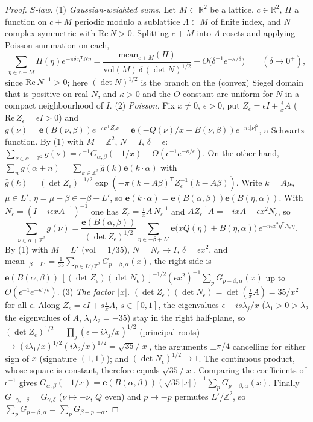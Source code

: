 \documentclass[11pt]{article}
\theoremstyle{definition}
\newcommand{\Z}{\mathbb{Z}}
\newcommand{\R}{\mathbb{R}}
\newcommand{\e}{\mathbf{e}}
\begin{document}
\begin{proof}
\emph{$S$-law.} (1) \emph{Gaussian-weighted sums.} Let $M\subset\R^2$ be a lattice, $c\in\R^2$, $\Pi$ a function on $c+M$ periodic modulo a
sublattice $\Lambda\subset M$ of finite index, and $N$ complex symmetric with $\mathrm{Re}\,N>0$. Splitting $c+M$ into $\Lambda$-cosets and applying
Poisson summation on each,
\[
\sum_{\eta\in c+M}\Pi(\eta)e^{-\pi\delta\,\eta^{\mathsf T}N\eta}=\frac{\mathrm{mean}_{c+M}(\Pi)}{\mathrm{vol}(M)\,\delta\,(\det N)^{1/2}}+O\bigl(\delta^{-1}e^{-\kappa/\delta}\bigr)
\qquad(\delta\to0^+),
\]
since $\mathrm{Re}\,N^{-1}>0$; here $(\det N)^{1/2}$ is the branch on the (convex) Siegel domain that is positive on real $N$, and $\kappa>0$ and the
$O$-constant are uniform for $N$ in a compact neighbourhood of $I$.
(2) \emph{Poisson.} Fix $x\ne0$, $\epsilon>0$, put $Z_\epsilon=\epsilon I+\tfrac ixA$ ($\mathrm{Re}\,Z_\epsilon=\epsilon I>0$) and
$g(\nu)=\e(B(\nu,\beta))e^{-\pi\nu^{\mathsf T}Z_\epsilon\nu}=\e(-Q(\nu)/x+B(\nu,\beta))e^{-\pi\epsilon|\nu|^2}$, a Schwartz function. By (1) with
$M=\Z^2$, $N=I$, $\delta=\epsilon$: $\sum_{\nu\in\alpha+\Z^2}g(\nu)=\epsilon^{-1}G_{\alpha,\beta}(-1/x)+O(\epsilon^{-1}e^{-\kappa/\epsilon})$.
On the other hand, $\sum_ng(\alpha+n)=\sum_{k\in\Z^2}\widehat g(k)\e(k\cdot\alpha)$ with
$\widehat g(k)=(\det Z_\epsilon)^{-1/2}\exp(-\pi(k-A\beta)^{\mathsf T}Z_\epsilon^{-1}(k-A\beta))$. Write $k=A\mu$, $\mu\in L'$, $\eta=\mu-\beta\in-\beta+L'$,
so $\e(k\cdot\alpha)=\e(B(\alpha,\beta))\e(B(\eta,\alpha))$. With $N_\epsilon=(I-i\epsilon xA^{-1})^{-1}$ one has
$Z_\epsilon=\tfrac ixA\,N_\epsilon^{-1}$ and $AZ_\epsilon^{-1}A=-ixA+\epsilon x^2N_\epsilon$, so
\[
\sum_{\nu\in\alpha+\Z^2}g(\nu)=\frac{\e(B(\alpha,\beta))}{(\det Z_\epsilon)^{1/2}}\sum_{\eta\in-\beta+L'}\e\bigl(xQ(\eta)+B(\eta,\alpha)\bigr)\,
e^{-\pi\epsilon x^2\eta^{\mathsf T}N_\epsilon\eta}.
\]
By (1) with $M=L'$ ($\mathrm{vol}=1/35$), $N=N_\epsilon\to I$, $\delta=\epsilon x^2$, and
$\mathrm{mean}_{-\beta+L'}=\tfrac1{35}\sum_{p\in L'/\Z^2}G_{p-\beta,\alpha}(x)$, the right side is
$\e(B(\alpha,\beta))\,[(\det Z_\epsilon)(\det N_\epsilon)]^{-1/2}(\epsilon x^2)^{-1}\sum_pG_{p-\beta,\alpha}(x)$ up to $O(\epsilon^{-1}e^{-\kappa'/\epsilon})$.
(3) \emph{The factor $|x|$.} $(\det Z_\epsilon)(\det N_\epsilon)=\det(\tfrac ixA)=35/x^2$ for all $\epsilon$. Along $Z_{s}=\epsilon I+s\tfrac ixA$, $s\in[0,1]$,
the eigenvalues $\epsilon+is\lambda_j/x$ ($\lambda_1>0>\lambda_2$ the eigenvalues of $A$, $\lambda_1\lambda_2=-35$) stay in the right half-plane, so
$(\det Z_\epsilon)^{1/2}=\prod_j(\epsilon+i\lambda_j/x)^{1/2}$ (principal roots) $\to(i\lambda_1/x)^{1/2}(i\lambda_2/x)^{1/2}=\sqrt{35}/|x|$, the arguments
$\pm\pi/4$ cancelling for either sign of $x$ (signature $(1,1)$); and $(\det N_\epsilon)^{1/2}\to1$. The continuous product, whose square is
constant, therefore equals $\sqrt{35}/|x|$. Comparing the coefficients of $\epsilon^{-1}$ gives
$G_{\alpha,\beta}(-1/x)=\e(B(\alpha,\beta))(\sqrt{35}|x|)^{-1}\sum_pG_{p-\beta,\alpha}(x)$. Finally $G_{-\gamma,-\delta}=G_{\gamma,\delta}$ ($\nu\mapsto-\nu$,
$Q$ even) and $p\mapsto-p$ permutes $L'/\Z^2$, so $\sum_pG_{p-\beta,\alpha}=\sum_pG_{\beta+p,-\alpha}$.
\end{proof}
\end{document}
